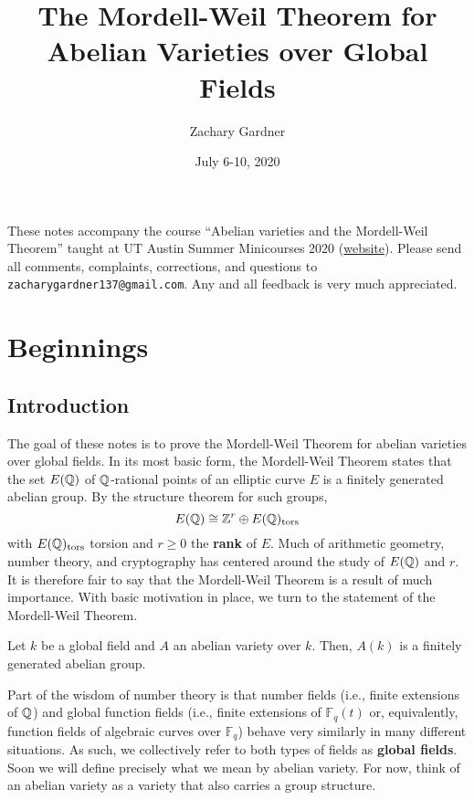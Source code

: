 \documentclass[11pt]{article}
\begin{document}
\title{The Mordell-Weil Theorem for Abelian Varieties over Global Fields}
\author{Zachary Gardner}
\date{July 6-10, 2020}
\maketitle

These notes accompany the course ``Abelian varieties and the Mordell-Weil Theorem'' taught at UT Austin Summer Minicourses 2020 (\href{https://web.ma.utexas.edu/SMC/Minicourses.html}{website}). Please send all comments, complaints, corrections, and questions to \texttt{zacharygardner137@gmail.com}. Any and all feedback is very much appreciated.

\tableofcontents
\newpage

\section{Beginnings}
\subsection{Introduction}
The goal of these notes is to prove the Mordell-Weil Theorem for abelian varieties over global fields. In its most basic form, the Mordell-Weil Theorem states that the set $E(\mathbb{Q})$ of $\mathbb{Q}$-rational points of an elliptic curve $E$ is a finitely generated abelian group. By the structure theorem for such groups,
$$E(\mathbb{Q})\cong\mathbb{Z}^r\oplus E(\mathbb{Q})_{\operatorname{tors}}$$
with $E(\mathbb{Q})_{\operatorname{tors}}$ torsion and $r\geq0$ the \textbf{rank} of $E$. Much of arithmetic geometry, number theory, and cryptography has centered around the study of $E(\mathbb{Q})$ and $r$. It is therefore fair to say that the Mordell-Weil Theorem is a result of much importance. With basic motivation in place, we turn to the statement of the Mordell-Weil Theorem.

\begin{theorem}\label{MW_Thm}
Let $k$ be a global field and $A$ an abelian variety over $k$. Then, $A(k)$ is a finitely generated abelian group.
\end{theorem}

Part of the wisdom of number theory is that number fields (i.e., finite extensions of $\mathbb{Q}$) and global function fields (i.e., finite extensions of $\mathbb{F}_q(t)$ or, equivalently, function fields of algebraic curves over $\mathbb{F}_q$) behave very similarly in many different situations. As such, we collectively refer to both types of fields as \textbf{global fields}. Soon we will define precisely what we mean by abelian variety. For now, think of an abelian variety as a variety that also carries a group structure. 
\end{document}
